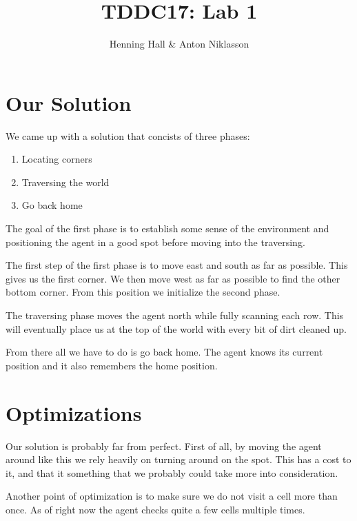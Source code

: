 \documentclass{article}
\begin{document}
\title{TDDC17: Lab 1}
\author{Henning Hall \& Anton Niklasson}
\maketitle

\section*{Our Solution}
We came up with a solution that concists of three phases:

\begin{enumerate}
	\item Locating corners
	\item Traversing the world
	\item Go back home
\end{enumerate}

The goal of the first phase is to establish some sense of the environment and positioning the agent in a good spot before moving into the traversing.

The first step of the first phase is to move east and south as far as possible. This gives us the first corner. We then move west as far as possible to find the other bottom corner. From this position we initialize the second phase.

The traversing phase moves the agent north while fully scanning each row. This will eventually place us at the top of the world with every bit of dirt cleaned up.

From there all we have to do is go back home. The agent knows its current position and it also remembers the home position.

\section*{Optimizations}

Our solution is probably far from perfect. First of all, by moving the agent around like this we rely heavily on turning around on the spot. This has a cost to it, and that it something that we probably could take more into consideration.

Another point of optimization is to make sure we do not visit a cell more than once. As of right now the agent checks quite a few cells multiple times.
\end{document}
